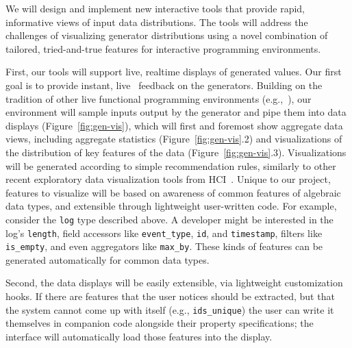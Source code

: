 We will design and implement new interactive tools that provide rapid,
informative views of input data distributions. The tools will address the
challenges of visualizing generator distributions using a novel combination of
tailored, tried-and-true features for interactive programming environments.

First, our tools will support live, realtime displays of generated values.
Our first goal is to provide
instant, live~\cite{ref:tanimoto1990viva} feedback on the generators. Building
on the tradition of other live functional programming environments
(e.g.,~\cite{tool:lighttable,ref:omar2019live}),
our environment will sample inputs
output by the generator and
pipe them into data displays (Figure~\ref{fig:gen-vis}), which
will first and foremost show aggregate data views, including aggregate
statistics (Figure~\ref{fig:gen-vis}.2) and visualizations of the distribution
of key features of the data (Figure~\ref{fig:gen-vis}.3). Visualizations will be
generated according to simple recommendation rules, similarly to other recent
exploratory data visualization tools from
HCI~\cite{ref:lee2021lux,wongsuphasawat_voyager_2016,
wongsuphasawat_voyager_2017}. Unique to our project, features to visualize will
be based on awareness of common features of algebraic data types, and extensible
through lightweight user-written code. For example, consider the
\lstinline{log} type
described above. A developer might be interested in the log's
\lstinline{length}, field accessors like \lstinline{event_type}, \lstinline{id},
and \lstinline{timestamp}, filters like \lstinline{is_empty}, and even
aggregators like \lstinline{max_by}. These kinds of features can be
generated automatically for common data types.

Second, the data displays will be easily extensible, via lightweight customization hooks. If
there are features that the user notices should be extracted, but that the
system cannot come up with itself (e.g., \lstinline{ids_unique}) the user can
write it themselves in companion code alongside their property specifications;
the interface will automatically load those features into the display.

